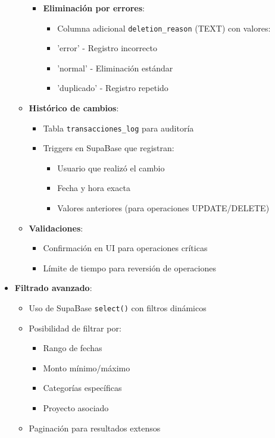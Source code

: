 \documentclass[12pt, a4paper]{article}
\begin{document}
\begin{itemize}
\begin{itemize}
\begin{itemize}
    \item \textbf{Eliminación por errores}:
    \begin{itemize}
        \item Columna adicional \texttt{deletion\_reason} (TEXT) con valores:
        \item \quad 'error' - Registro incorrecto
        \item \quad 'normal' - Eliminación estándar
        \item \quad 'duplicado' - Registro repetido
    \end{itemize}
\end{itemize}
    \item \textbf{Histórico de cambios}:
    \begin{itemize}
        \item Tabla \texttt{transacciones\_log} para auditoría
        \item Triggers en SupaBase que registran:
        \begin{itemize}
            \item Usuario que realizó el cambio
            \item Fecha y hora exacta
            \item Valores anteriores (para operaciones UPDATE/DELETE)
        \end{itemize}
    \end{itemize}
    
    \item \textbf{Validaciones}:
    \begin{itemize}
        \item Confirmación en UI para operaciones críticas
        \item Límite de tiempo para reversión de operaciones
    \end{itemize}
\end{itemize}
    
    \item \textbf{Filtrado avanzado}:
    \begin{itemize}
        \item Uso de SupaBase \texttt{select()} con filtros dinámicos
        \item Posibilidad de filtrar por:
        \begin{itemize}
            \item Rango de fechas
            \item Monto mínimo/máximo
            \item Categorías específicas
            \item Proyecto asociado
        \end{itemize}
        \item Paginación para resultados extensos
    \end{itemize}
    

\end{itemize}
\end{document}
